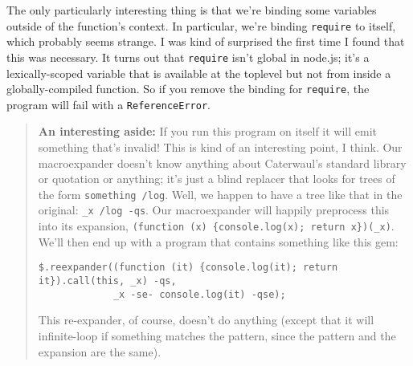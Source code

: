 \documentclass{report}
\begin{document}

    The only particularly interesting thing is that we're binding some variables outside of the function's context. In particular, we're binding {\tt require} to itself, which probably seems
    strange. I was kind of surprised the first time I found that this was necessary. It turns out that {\tt require} isn't global in node.js; it's a lexically-scoped variable that is available
    at the toplevel but not from inside a globally-compiled function. So if you remove the binding for {\tt require}, the program will fail with a {\tt ReferenceError}.

\begin{quotation}
{\bf An interesting aside:} If you run this program on itself it will emit something that's invalid! This is kind of an interesting point, I think. Our macroexpander doesn't know
anything about Caterwaul's standard library or quotation or anything; it's just a blind replacer that looks for trees of the form {\tt something /log}. Well, we happen to have a tree
like that in the original: \verb|_x /log -qs|. Our macroexpander will happily preprocess this into its expansion, \verb|(function (x) {console.log(x); return x})(_x)|. We'll then end up
with a program that contains something like this gem:

\begin{verbatim}
$.reexpander((function (it) {console.log(it); return it}).call(this, _x) -qs,
             _x -se- console.log(it) -qse);
\end{verbatim}

This re-expander, of course, doesn't do anything (except that it will infinite-loop if something matches the pattern, since the pattern and the expansion are the same).
\end{quotation}
\end{document}
